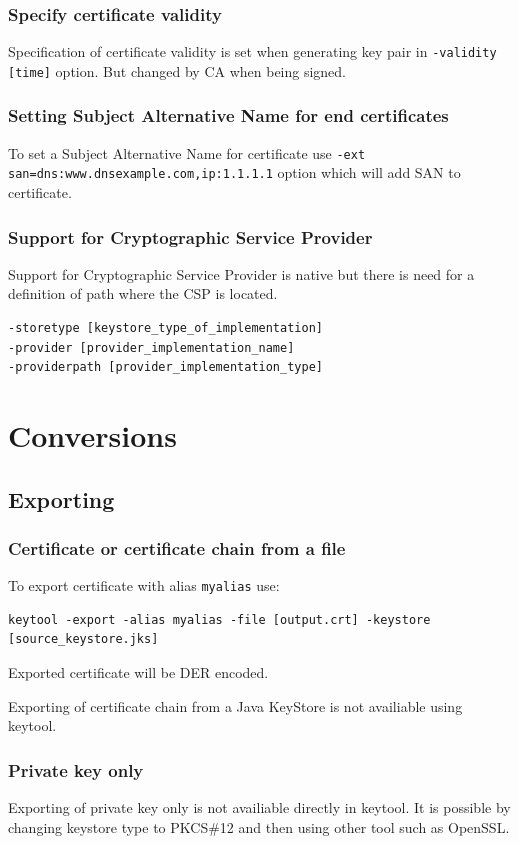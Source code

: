 \documentclass[10pt, a4paper]{report}
\begin{document}
{    \subsubsection{Specify certificate validity}
Specification of certificate validity is set when generating key pair in \verb+-validity [time]+ option. But changed by CA when being signed.

    \subsubsection{Setting Subject Alternative Name for end certificates}
To set a Subject Alternative Name for certificate use \verb+-ext san=dns:www.dnsexample.com,ip:1.1.1.1+ option which will add SAN to certificate.

    \subsubsection{Support for Cryptographic Service Provider}
Support for Cryptographic Service Provider is native but there is need for a definition of path where the CSP is located.
\begin{verbatim}
-storetype [keystore_type_of_implementation]
-provider [provider_implementation_name]
-providerpath [provider_implementation_type]
\end{verbatim}

    
\section{Conversions}

  \subsection{Exporting}
  
    \subsubsection{Certificate or certificate chain from a file}
To export certificate with alias \verb+myalias+ use:
\begin{verbatim}
keytool -export -alias myalias -file [output.crt] -keystore [source_keystore.jks]
\end{verbatim}  
Exported certificate will be DER encoded.

Exporting of certificate chain from a Java KeyStore is not availiable using keytool.

    \subsubsection{Private key only}
Exporting of private key only is not availiable directly in keytool. It is possible by changing keystore type to PKCS\#12 and then using other tool such as OpenSSL.

}
\end{document}
